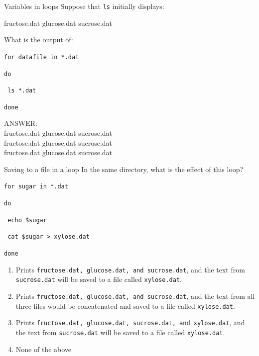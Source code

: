\documentclass{beamer}
\begin{document}
\begin{frame}{Variables in loops}
Suppose that \texttt{ls} initially displays:
\vspace{0.7cm}
\begin{beamerboxesrounded}[upper=uppercolgreen,lower=lowercolgreen,shadow=false]{}
fructose.dat      glucose.dat       sucrose.dat
\end{beamerboxesrounded}

What is the output of:
\vspace{0.7cm}
\begin{beamerboxesrounded}[upper=uppercolgreen,lower=lowercolgreen,shadow=false]{}
\texttt{for datafile in *.dat}

\texttt{do}

\texttt{	ls *.dat}

\texttt{done}
\end{beamerboxesrounded}

\alert{ANSWER:\\ }
fructose.dat      glucose.dat       sucrose.dat\\
fructose.dat      glucose.dat       sucrose.dat\\
fructose.dat      glucose.dat       sucrose.dat\\

\end{frame}



\begin{frame}{Saving to a file in a loop }
In the same directory, what is the effect of this loop?

\begin{beamerboxesrounded}[upper=uppercolgreen,lower=lowercolgreen,shadow=false]{}
\texttt{for sugar in *.dat}

\texttt{do}

\texttt{	echo \$sugar}

\texttt{	cat \$sugar > xylose.dat}

\texttt{done}
\end{beamerboxesrounded}

\small{
\begin{enumerate}
\item{Prints \texttt{fructose.dat, glucose.dat, and sucrose.dat}, and the text from \texttt{sucrose.dat} will be saved to a file called \texttt{xylose.dat}.}
\item{Prints \texttt{fructose.dat, glucose.dat, and sucrose.dat}, and the text from all three files would be concatenated and saved to a file called \texttt{xylose.dat}.}
\item{Prints \texttt{fructose.dat, glucose.dat, sucrose.dat, and xylose.dat}, and the text from \texttt{sucrose.dat}  will be saved to a file called \texttt{xylose.dat}.}
\item{None of the above}
\end{enumerate}}


\end{frame}
\end{document}
